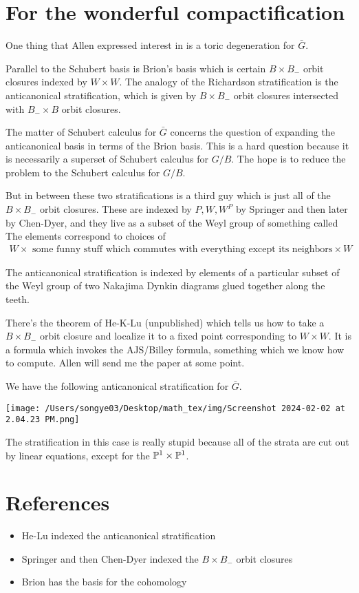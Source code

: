 \documentclass[12pt]{article}
\begin{document}
\section{For the wonderful compactification}
One thing that Allen expressed interest in is a toric degeneration for $\bar G$.

\hfill

Parallel to the Schubert basis is Brion's basis which is certain $B\times B_-$ orbit closures indexed
by $W\times W$. The analogy of the Richardson stratification is the anticanonical stratification,
which is given by $B\times B_-$ orbit closures intersected with $B_-\times B$ orbit closures.

\hfill

The matter of Schubert calculus for $\bar G$ concerns the question of expanding the anticanonical basis
in terms of the Brion basis. This is a hard question because it is necessarily a superset of 
Schubert calculus for $G/B$. The hope is to reduce the problem to the Schubert calculus for $G/B$.

\hfill

But in between these two stratifications is a third guy which is just all of the $B\times B_-$ orbit closures.
These are indexed by $P,W,W^P$ by Springer and then later by Chen-Dyer, and they live as a 
subset of the Weyl group of something called  The elements correspond
to choices of
 \begin{align*}
    W\times\text{ some funny stuff which commutes with everything except its neighbors} \times W
 \end{align*}


\hfill

The anticanonical stratification is indexed by elements of a particular subset of the Weyl group of two Nakajima Dynkin
diagrams glued together along the teeth.

\hfill

There's the theorem of He-K-Lu (unpublished) which tells us how to take a $B\times B_-$ orbit closure and localize it
to a fixed point corresponding to $W\times W$. It is a formula which invokes the AJS/Billey formula, something
which we know how to compute. Allen will send me the paper at some point.

\hfill

\begin{example}
    We have the following anticanonical stratification for $\bar G$.
    \begin{center}
        \texttt{[image: /Users/songye03/Desktop/math\_tex/img/Screenshot 2024-02-02 at 2.04.23 PM.png]}
    \end{center}
    The stratification in this case is really stupid because all of the strata are cut out by linear equations, except for the
    $\P^1\times \P^1$.
\end{example}

\section{References}
\begin{itemize}
    \item He-Lu indexed the anticanonical stratification
    \item Springer and then Chen-Dyer indexed the $B\times B_-$ orbit closures
    \item Brion has the basis for the cohomology
\end{itemize}
\end{document}
